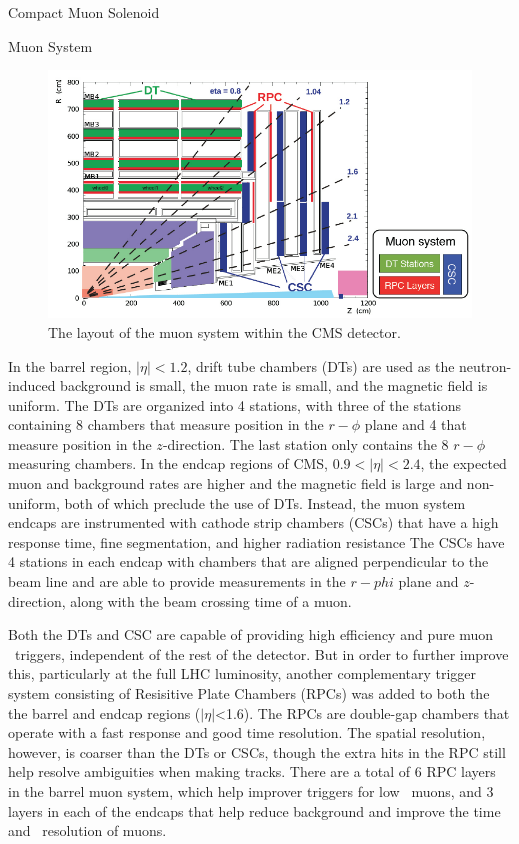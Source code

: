 \begin{section}{Compact Muon Solenoid}
\begin{subsection}{Muon System}
\begin{figure}[tbp!]
\begin{center}
\includegraphics[angle=0,width=0.80\columnwidth]{fig/cms_muonsys.png}
\end{center}
\caption{The layout of the muon system within the CMS detector.~\cite{1748-0221-8-04-P04005}}
\label{fig:cms_muonsys}
\end{figure}

In the barrel region, $|\eta|<1.2$, drift tube chambers (DTs) are used as the neutron-induced background is small, the muon rate is small, and the magnetic field is uniform.
The DTs are organized into 4 stations, with three of the stations containing 8 chambers that measure position in the $r-\phi$ plane and 4 that measure position in the $z$-direction.
The last station only contains the 8 $r-\phi$ measuring chambers.
In the endcap regions of CMS, $0.9<|\eta|<2.4$, the expected muon and background rates are higher and the magnetic field is large and non-uniform, both of which preclude the use of DTs.
Instead, the muon system endcaps are instrumented with cathode strip chambers (CSCs) that have a high response time, fine segmentation, and higher radiation resistance
The CSCs have 4 stations in each endcap with chambers that are aligned perpendicular to the beam line and are able to provide measurements in the $r-phi$ plane and $z$-direction, along with the beam crossing time of a muon.

Both the DTs and CSC are capable of providing high efficiency and pure muon \pT\ triggers, independent of the rest of the detector.
But in order to further improve this, particularly at the full LHC luminosity, another complementary trigger system consisting of Resisitive Plate Chambers (RPCs) was added to both the the barrel and endcap regions ($|\eta|$<1.6).
The RPCs are double-gap chambers that operate with a fast response and good time resolution.
The spatial resolution, however, is coarser than the DTs or CSCs, though the extra hits in the RPC still help resolve ambiguities when making tracks.
There are a total of 6 RPC layers in the barrel muon system, which help improver triggers for low \pT\ muons, and 3 layers in each of the endcaps that help reduce background and improve the time and \pT\ resolution of muons.


\end{subsection}
\end{section}
